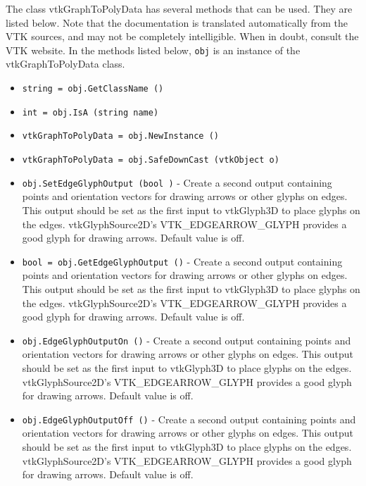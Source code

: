 The class vtkGraphToPolyData has several methods that can be used.
  They are listed below.
Note that the documentation is translated automatically from the VTK sources,
and may not be completely intelligible.  When in doubt, consult the VTK website.
In the methods listed below, \verb|obj| is an instance of the vtkGraphToPolyData class.
\begin{itemize}
\item  \verb|string = obj.GetClassName ()|

\item  \verb|int = obj.IsA (string name)|

\item  \verb|vtkGraphToPolyData = obj.NewInstance ()|

\item  \verb|vtkGraphToPolyData = obj.SafeDownCast (vtkObject o)|

\item  \verb|obj.SetEdgeGlyphOutput (bool )| -  Create a second output containing points and orientation vectors
 for drawing arrows or other glyphs on edges.  This output should be
 set as the first input to vtkGlyph3D to place glyphs on the edges.
 vtkGlyphSource2D's VTK\_EDGEARROW\_GLYPH provides a good glyph for 
 drawing arrows.
 Default value is off.

\item  \verb|bool = obj.GetEdgeGlyphOutput ()| -  Create a second output containing points and orientation vectors
 for drawing arrows or other glyphs on edges.  This output should be
 set as the first input to vtkGlyph3D to place glyphs on the edges.
 vtkGlyphSource2D's VTK\_EDGEARROW\_GLYPH provides a good glyph for 
 drawing arrows.
 Default value is off.

\item  \verb|obj.EdgeGlyphOutputOn ()| -  Create a second output containing points and orientation vectors
 for drawing arrows or other glyphs on edges.  This output should be
 set as the first input to vtkGlyph3D to place glyphs on the edges.
 vtkGlyphSource2D's VTK\_EDGEARROW\_GLYPH provides a good glyph for 
 drawing arrows.
 Default value is off.

\item  \verb|obj.EdgeGlyphOutputOff ()| -  Create a second output containing points and orientation vectors
 for drawing arrows or other glyphs on edges.  This output should be
 set as the first input to vtkGlyph3D to place glyphs on the edges.
 vtkGlyphSource2D's VTK\_EDGEARROW\_GLYPH provides a good glyph for 
 drawing arrows.
 Default value is off.


\end{itemize}
